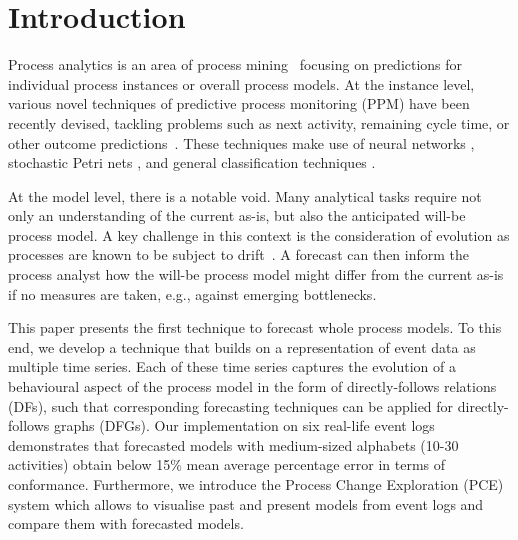 \section{Introduction}\label{sec:introduction}
Process analytics is an area of process mining~\cite{van2016data} focusing on predictions for individual process instances or overall process models. At the instance level, various novel techniques of predictive process monitoring (PPM) have been recently devised, tackling problems such as next activity, remaining cycle time, or other outcome predictions~\cite{DBLP:conf/bpm/Francescomarino18}. These techniques make use of neural networks \cite{DBLP:conf/caise/TaxVRD17}, stochastic Petri nets \cite{DBLP:conf/icsoc/Rogge-SoltiW13}, and general classification techniques \cite{DBLP:journals/tkdd/TeinemaaDRM19}.

At the model level, there is a notable void. Many analytical tasks require not only an understanding of the current as-is, but also the anticipated will-be process model. A key challenge in this context is the consideration of evolution as processes are known to be subject to drift~\cite{maaradji2017detecting,DBLP:conf/bpm/PollPRRR18,yeshchenko2019comprehensive,yeshchenko2021visual}. A forecast can then inform the process analyst how the will-be process model might differ from the current as-is if no measures are taken, e.g., against emerging bottlenecks.

This paper presents the first technique to forecast whole process models. To this end, we develop a technique that builds on a representation of event data as multiple time series. Each of these time series captures the evolution of a behavioural aspect of the process model in the form of directly-follows relations (DFs), such that corresponding forecasting techniques can be applied for directly-follows graphs (DFGs). Our implementation on six real-life event logs demonstrates that forecasted models with medium-sized alphabets (10-30 activities) obtain below 15\% mean average percentage error in terms of conformance.
Furthermore, we introduce the Process Change Exploration (PCE) system which allows to visualise past and present models from event logs and compare them with forecasted models.


